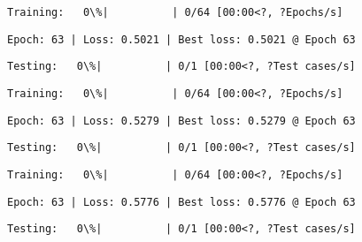 \documentclass[11pt]{article}
\begin{document}
    
    
    \begin{Verbatim}[commandchars=\\\{\}]
Training:   0\%|          | 0/64 [00:00<?, ?Epochs/s]
    \end{Verbatim}

    
    \begin{Verbatim}[commandchars=\\\{\}]
Epoch: 63 | Loss: 0.5021 | Best loss: 0.5021 @ Epoch 63
    \end{Verbatim}

    
    \begin{Verbatim}[commandchars=\\\{\}]
Testing:   0\%|          | 0/1 [00:00<?, ?Test cases/s]
    \end{Verbatim}

    
    
    \begin{Verbatim}[commandchars=\\\{\}]
Training:   0\%|          | 0/64 [00:00<?, ?Epochs/s]
    \end{Verbatim}

    
    \begin{Verbatim}[commandchars=\\\{\}]
Epoch: 63 | Loss: 0.5279 | Best loss: 0.5279 @ Epoch 63
    \end{Verbatim}

    
    \begin{Verbatim}[commandchars=\\\{\}]
Testing:   0\%|          | 0/1 [00:00<?, ?Test cases/s]
    \end{Verbatim}

    
    
    \begin{Verbatim}[commandchars=\\\{\}]
Training:   0\%|          | 0/64 [00:00<?, ?Epochs/s]
    \end{Verbatim}

    
    \begin{Verbatim}[commandchars=\\\{\}]
Epoch: 63 | Loss: 0.5776 | Best loss: 0.5776 @ Epoch 63
    \end{Verbatim}

    
    \begin{Verbatim}[commandchars=\\\{\}]
Testing:   0\%|          | 0/1 [00:00<?, ?Test cases/s]
    \end{Verbatim}
\end{document}
